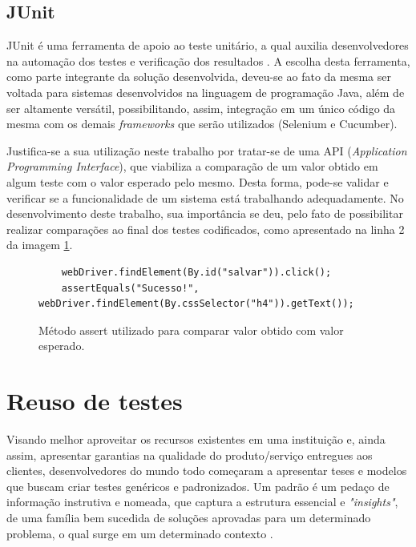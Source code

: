\documentclass[tg]{mdtufsm}
\begin{document}
\subsection{JUnit}
JUnit é uma ferramenta de apoio ao teste unitário, a qual auxilia desenvolvedores na automação dos testes e verificação dos resultados \cite{biasi2006geraccao}. A escolha desta ferramenta, como parte integrante da solução desenvolvida, deveu-se ao fato da mesma ser voltada para sistemas desenvolvidos na linguagem de programação Java, além de ser altamente versátil, possibilitando, assim, integração em um único código da mesma com os demais \emph{frameworks} que serão utilizados (Selenium e Cucumber).

Justifica-se a sua utilização neste trabalho por tratar-se de uma API (\emph{Application Programming Interface}), que viabiliza a comparação de um valor obtido em algum teste com o valor esperado pelo mesmo. Desta forma, pode-se validar e verificar se
a funcionalidade de um sistema está trabalhando adequadamente.
No desenvolvimento deste trabalho, sua importância se deu, pelo fato de possibilitar realizar comparações ao final dos testes codificados, como apresentado na linha 2 da imagem \ref{code:JUnit assert}.

\begin{figure}[!htb]
	\begin{lstlisting}
	webDriver.findElement(By.id("salvar")).click();
	assertEquals("Sucesso!", webDriver.findElement(By.cssSelector("h4")).getText());
	\end{lstlisting}
	\caption{Método assert utilizado para comparar valor obtido com valor esperado.}
	\label{code:JUnit assert}
\end{figure}

\section{Reuso de testes}

Visando melhor aproveitar os recursos existentes em uma instituição e, ainda assim, apresentar garantias na qualidade do produto/serviço entregues aos clientes, desenvolvedores do mundo todo começaram a apresentar
teses e modelos que buscam criar testes genéricos e padronizados. Um padrão é um pedaço de informação instrutiva e nomeada, que captura a estrutura essencial
e \emph{"insights"}, de uma família bem sucedida de soluções aprovadas para um determinado problema, o qual surge em um determinado contexto \cite{cagnin2004reuso}.
\end{document}
